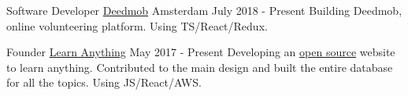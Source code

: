 
\begin{cventries}

  \cventry
    {Software Developer} %
    {\href{https://www.deedmob.com}{Deedmob}} %
    {Amsterdam} %
    {July 2018 - Present} %
    {
      {Building Deedmob, online volunteering platform. Using TS/React/Redux.}
    }

  \cventry
    {Founder} %
    {\href{https://learn-anything.xyz}{Learn Anything}} %
    {} %
    {May 2017 - Present} %
    {
      {Developing an \href{https://github.com/learn-anything/learn-anything}{open source} website to learn anything. Contributed to the main design and built the entire database for all the topics. Using JS/React/AWS.}
    }

\end{cventries}
